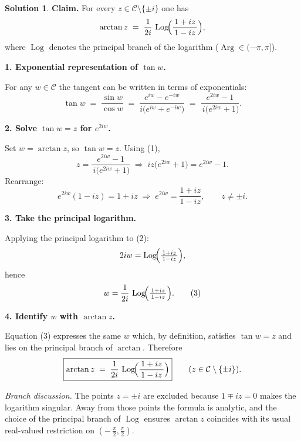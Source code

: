 \documentclass[12pt]{article}
\DeclareMathOperator{\Log}{Log}
\DeclareMathOperator{\Arg}{Arg}
\theoremstyle{definition} %
\newtheorem{solution}{Solution}
\theoremstyle{plain} %
\begin{document}
      \begin{solution}
        \textbf{Claim.}\; For every \(z\in\mathcal{C}\setminus\{\pm i\}\) one has
        \[
           \arctan z \;=\;\frac{1}{2i}\,
           \Log\!\Bigl(\frac{1+iz}{\,1-iz\,}\Bigr),
        \]
        where \(\Log\) denotes the principal branch of the logarithm
        (\(\Arg\in(-\pi,\pi]\)).
        
        \bigskip
        \textbf{1.  Exponential representation of \(\tan w\).}
        
        For any \(w\in\mathcal{C}\) the tangent can be written in terms of exponentials:
        \[
           \tan w
           \;=\;
           \frac{\sin w}{\cos w}
           \;=\;
           \frac{e^{iw}-e^{-iw}}{i\bigl(e^{iw}+e^{-iw}\bigr)}
           \;=\;
           \frac{e^{2iw}-1}{\,i\bigl(e^{2iw}+1\bigr)}.
        \tag{1}
        \]
        
        \bigskip
        \textbf{2.  Solve \(\tan w=z\) for \(e^{2iw}\).}
        
        Set \(w=\arctan z\), so \(\tan w=z\).  
        Using (1),
        \[
           z
           =\frac{e^{2iw}-1}{\,i\bigl(e^{2iw}+1\bigr)}
           \;\Longrightarrow\;
           i z\bigl(e^{2iw}+1\bigr)=e^{2iw}-1.
        \]
        Rearrange:
        \[
           e^{2iw}(1-iz)=1+iz
           \;\Longrightarrow\;
           e^{2iw}
             =\frac{1+iz}{1-iz},
             \qquad z\neq\pm i.
        \tag{2}
        \]
        
        \bigskip
        \textbf{3.  Take the principal logarithm.}
        
        Applying the principal logarithm to (2):
        \[
           2iw
           =\Log\!\Bigl(\tfrac{1+iz}{\,1-iz\,}\Bigr),
        \]
        hence
        \[
           w
           =\frac{1}{2i}\,
             \Log\!\Bigl(\tfrac{1+iz}{\,1-iz\,}\Bigr).
        \tag{3}
        \]
        
        \bigskip
        \textbf{4.  Identify \(w\) with \(\arctan z\).}
        
        Equation (3) expresses the same \(w\) which, by definition, satisfies
        \(\tan w=z\) and lies on the principal branch of \(\arctan\).  
        Therefore
        \[
           \boxed{\displaystyle
              \arctan z
              \;=\;
              \frac{1}{2i}\,
              \Log\!\Bigl(\frac{1+iz}{\,1-iz\,}\Bigr)}
              \qquad(z\in\mathcal{C}\setminus\{\pm i\}).
        \]
        
        \medskip
        \textit{Branch discussion.}  
        The points \(z=\pm i\) are excluded because \(1\mp iz=0\) makes the
        logarithm singular.  
        Away from those points the formula is analytic, and the choice of the
        principal branch of \(\Log\) ensures \(\arctan z\) coincides with its usual
        real‑valued restriction on \((-\,\tfrac{\pi}{2},\tfrac{\pi}{2})\).
        \end{solution}
\end{document}
